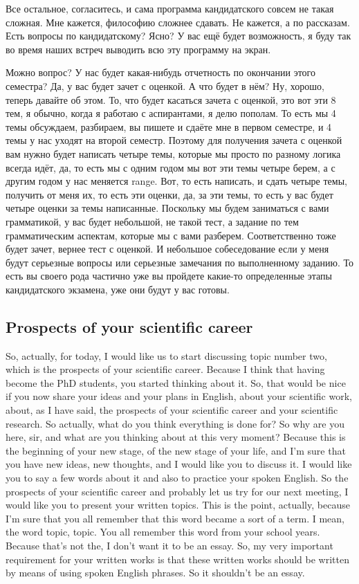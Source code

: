 \documentclass[main.tex]{subfiles}
\begin{document}
Все остальное, согласитесь, и сама программа кандидатского совсем не такая сложная.
Мне кажется, философию сложнее сдавать.
Не кажется, а по рассказам.
Есть вопросы по кандидатскому?
Ясно?
У вас ещё будет возможность, я буду так во время наших встреч выводить всю эту программу на экран.

Можно вопрос? У нас будет какая-нибудь отчетность по окончании этого семестра?
Да, у вас будет зачет с оценкой.
А что будет в нём?
Ну, хорошо, теперь давайте об этом.
То, что будет касаться зачета с оценкой, это вот эти 8 тем, я обычно, когда я работаю с аспирантами, я делю пополам.
То есть мы 4 темы обсуждаем, разбираем, вы пишете и сдаёте мне в первом семестре, и 4 темы у нас уходят на второй семестр.
Поэтому для получения зачета с оценкой вам нужно будет написать четыре темы, которые мы просто по разному логика всегда идёт, да, то есть мы с одним годом мы вот эти темы четыре берем, а с другим годом у нас меняется range.
Вот, то есть написать, и сдать четыре темы, получить от меня их, то есть эти оценки, да, за эти темы, то есть у вас будет четыре оценки за темы написанные.
Поскольку мы будем заниматься с вами грамматикой, у вас будет небольшой, не такой тест, а задание по тем грамматическим аспектам, которые мы с вами разберем.
Соответственно тоже будет зачет, вернее тест с оценкой.
И небольшое собеседование если у меня будут серьезные вопросы или серьезные замечания по выполненному заданию.
То есть вы своего рода частично уже вы пройдете какие-то определенные этапы кандидатского экзамена, уже они будут у вас готовы.

\subsection{Prospects of your scientific career}

So, actually, for today, I would like us to start discussing topic number two, which is the prospects of your scientific career.
Because I think that having become the PhD students, you started thinking about it.
So, that would be nice if you now share your ideas and your plans in English, about your scientific work, about, as I have said, the prospects of your scientific career and your scientific research.
So actually, what do you think everything is done for?
So why are you here, sir, and what are you thinking about at this very moment?
Because this is the beginning of your new stage, of the new stage of your life, and I'm sure that you have new ideas, new thoughts, and I would like you to discuss it.
I would like you to say a few words about it and also to practice your spoken English.
So the prospects of your scientific career and probably let us try for our next meeting, I would like you to present your written topics.
This is the point, actually, because I'm sure that you all remember that this word became a sort of a term.
I mean, the word topic, topic.
You all remember this word from your school years.
Because that's not the, I don't want it to be an essay.
So, my very important requirement for your written works is that these written works should be written by means of using spoken English phrases.
So it shouldn't be an essay.
\end{document}
